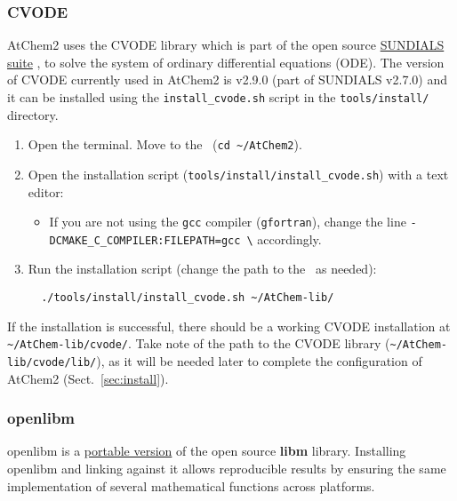 \subsubsection{CVODE}

AtChem2 uses the CVODE library which is part of the open source
\href{https://computing.llnl.gov/projects/sundials}{SUNDIALS suite}
\citep{hindmarsh_2005}, to solve the system of ordinary differential
equations (ODE). The version of CVODE currently used in AtChem2 is
v2.9.0 (part of SUNDIALS v2.7.0) and it can be installed using the
\texttt{install\_cvode.sh} script in the \texttt{tools/install/}
directory.

\begin{enumerate}
\item Open the terminal. Move to the \maindir\ (\verb|cd ~/AtChem2|).
\item Open the installation script (\texttt{tools/install/install\_cvode.sh})
  with a text editor:
  \begin{itemize}
  \item If you are not using the \texttt{gcc} compiler
    (\texttt{gfortran}), change the line
    \texttt{-DCMAKE\_C\_COMPILER:FILEPATH=gcc \textbackslash}
    accordingly.
  \end{itemize}
\item Run the installation script (change the path to the \depdir\ as
  needed):
  \begin{verbatim}
  ./tools/install/install_cvode.sh ~/AtChem-lib/
  \end{verbatim}
\end{enumerate}

If the installation is successful, there should be a working CVODE
installation at \texttt{\textasciitilde/AtChem-lib/cvode/}. Take note
of the path to the CVODE library
(\texttt{\textasciitilde/AtChem-lib/cvode/lib/}), as it will be needed
later to complete the configuration of AtChem2 (Sect.~\ref{sec:install}).

\subsubsection{openlibm}

openlibm is a \href{https://openlibm.org}{portable version} of the
open source \textbf{libm} library. Installing openlibm and linking
against it allows reproducible results by ensuring the same
implementation of several mathematical functions across platforms.

